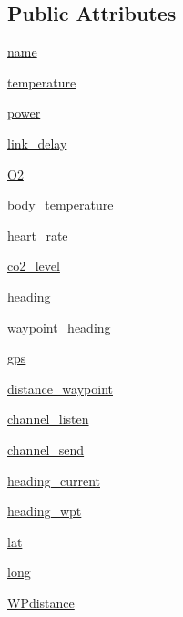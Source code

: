 \subsection*{Public Attributes}
\begin{DoxyCompactItemize}
\item 
\hyperlink{classmodel_1_1MPS__MODEL_1_1MPS_a34c0777c8f2753a782208a72b0ad51ed}{name}
\item 
\hyperlink{classmodel_1_1MPS__MODEL_1_1MPS_af856ffc36b02be59cc50b46d49ad408c}{temperature}
\item 
\hyperlink{classmodel_1_1MPS__MODEL_1_1MPS_a1c6a7ec24b1664643e627e4a5a58748f}{power}
\item 
\hyperlink{classmodel_1_1MPS__MODEL_1_1MPS_a9a2c3ca44da158be4528c9115c28de5d}{link\+\_\+delay}
\item 
\hyperlink{classmodel_1_1MPS__MODEL_1_1MPS_a8f767a5c0a350bb2c543437ccce4b4a0}{O2}
\item 
\hyperlink{classmodel_1_1MPS__MODEL_1_1MPS_aaed71a3337c934e8ecc8398c3cc14b50}{body\+\_\+temperature}
\item 
\hyperlink{classmodel_1_1MPS__MODEL_1_1MPS_aaf5ff8b1b36738d4c7e6d3421c37ff91}{heart\+\_\+rate}
\item 
\hyperlink{classmodel_1_1MPS__MODEL_1_1MPS_a308a391203557d5779807c9bb61e8597}{co2\+\_\+level}
\item 
\hyperlink{classmodel_1_1MPS__MODEL_1_1MPS_a71336012e379f522e35f45bc45d9122b}{heading}
\item 
\hyperlink{classmodel_1_1MPS__MODEL_1_1MPS_a96d9a3fcd3cfea8f85d3255742a00995}{waypoint\+\_\+heading}
\item 
\hyperlink{classmodel_1_1MPS__MODEL_1_1MPS_a5ed01a4c704d79422f4da839a2d6f5a2}{gps}
\item 
\hyperlink{classmodel_1_1MPS__MODEL_1_1MPS_af20780da6d6987d7a6d4bf7ba744e623}{distance\+\_\+waypoint}
\item 
\hyperlink{classmodel_1_1MPS__MODEL_1_1MPS_a7dfed4b21b70b5ecd403ee33b82aa85b}{channel\+\_\+listen}
\item 
\hyperlink{classmodel_1_1MPS__MODEL_1_1MPS_aa7eb9f06092cd55033d8f040e9dac27f}{channel\+\_\+send}
\item 
\hyperlink{classmodel_1_1MPS__MODEL_1_1MPS_abd407cc872c9025e78f102bf952a2061}{heading\+\_\+current}
\item 
\hyperlink{classmodel_1_1MPS__MODEL_1_1MPS_af51ebf16db663280def23c2d4f42e96d}{heading\+\_\+wpt}
\item 
\hyperlink{classmodel_1_1MPS__MODEL_1_1MPS_a43a791940988177e1ddafe94f3cdde91}{lat}
\item 
\hyperlink{classmodel_1_1MPS__MODEL_1_1MPS_a382980498cd8fd5ebf7053142163a482}{long}
\item 
\hyperlink{classmodel_1_1MPS__MODEL_1_1MPS_a3e79c73cf4a5a655b367ccb1302c5fb6}{W\+Pdistance}
\end{DoxyCompactItemize}


